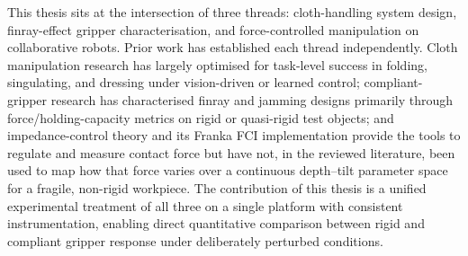 This thesis sits at the intersection of three threads: cloth-handling
system design, finray-effect gripper characterisation, and
force-controlled manipulation on collaborative robots. Prior work has
established each thread independently. Cloth manipulation research has
largely optimised for task-level success in folding, singulating, and
dressing under vision-driven or learned control; compliant-gripper research has
characterised finray and jamming designs primarily through force/holding-capacity
metrics on rigid or quasi-rigid test objects; and impedance-control theory
and its Franka FCI implementation provide the tools to regulate and
measure contact force but have not, in the reviewed literature, been used
to map how that force varies over a continuous depth--tilt parameter space
for a fragile, non-rigid workpiece. The contribution of this thesis is a
unified experimental treatment of all three on a single platform with
consistent instrumentation, enabling direct quantitative comparison
between rigid and compliant gripper response under deliberately perturbed
conditions.
